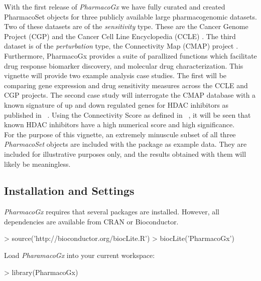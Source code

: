\documentclass[11pt]{article}
\begin{document}
With the first release of \textit{PharmacoGx} we have fully curated and
created PharmacoSet objects for three publicly available large pharmacogenomic
datasets. Two of these datasets are of the \textit{sensitivity} type. These
are the Cancer Genome Project (CGP) \cite{Garnett:2012fc} and the Cancer Cell
Line Encyclopedia (CCLE) \cite{Barretina:2012fp}. The third dataset is of the
\textit{perturbation} type, the Connectivity Map (CMAP) project
\cite{Lamb:2006hf}.\\

Furthermore, PharmacoGx provides a suite of parallized functions which
facilitate drug response biomarker discovery, and molecular drug
characterization. This vignette will provide two example analysis case
studies. The first will be comparing gene expression and drug sensitivity
measures across the CCLE and CGP projects. The second case study will
interrogate the CMAP database with a known signature of up and down regulated
genes for HDAC inhibitors as published in ~\cite{Glaser:2003gk}. Using the
Connectivity Score as defined in ~\cite{Lamb:2006hf}, it will be seen that
known HDAC inhibitors have a high numerical score and high significance.\\ 

For the purpose of this vignette, an extremely minuscule subset of all three
\textit{PharmacoSet} objects are included with the package as example data.
They are included for illustrative purposes only, and the results obtained
with them will likely be meaningless.\\


\subsection{Installation and Settings}

\textit{PharmacoGx} requires that several packages are installed. However, all dependencies are available from CRAN or Bioconductor.

\begin{Schunk}
\begin{Sinput}
> source('http://bioconductor.org/biocLite.R')
> biocLite('PharmacoGx')
\end{Sinput}
\end{Schunk}

Load \textit{PharamacoGx} into your current workspace:
\begin{Schunk}
\begin{Sinput}
> library(PharmacoGx)
\end{Sinput}
\end{Schunk}
\end{document}
